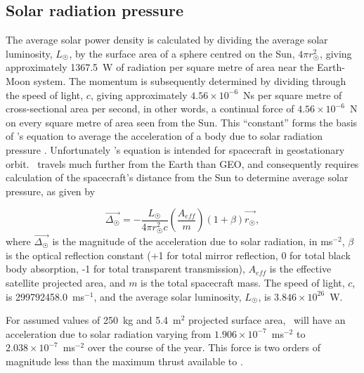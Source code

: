 \subsection{Solar radiation pressure} \label{sub:Solar-Wind}


The average solar power density is calculated by dividing the average solar luminosity, $L_\Sun$,  by the surface area of a sphere centred on the Sun, $4\pi r_\Sun^2$, giving approximately 1367.5~W of radiation per square metre of area near the Earth-Moon system. The momentum is subsequently determined by dividing through the speed of light, $c$, giving approximately $4.56\times10^{-6}$~Ns per square metre of cross-sectional area per second, in other words, a continual force of $4.56\times10^{-6}$~N on every square metre of area seen from the Sun. This \enquote{constant} forms the basis of \citeauthor{Chobotov2002}'s equation to average the acceleration of a body due to solar radiation pressure \parencite[p. 223]{Chobotov2002}. Unfortunately \citeauthor{Chobotov2002}'s equation is intended for spacecraft in geostationary orbit. \BW\ travels much further from the Earth than GEO, and consequently requires calculation of the spacecraft's distance from the Sun to determine average solar pressure, as given by

\begin{equation}\label{eq:solar-wind}
\vec{\Delta_\Sun} = -\frac{L_\Sun}{4\pi r_\Sun^2c}\left(\frac{A_{eff}}{m}\right)(1+\beta)\vec{\hat{r_\Sun}},
\end{equation}
where $\vec{\Delta_\Sun}$ is the magnitude of the acceleration due to solar radiation, in ms$^{-2}$, $\beta$ is the optical reflection constant (+1 for total mirror reflection, 0 for total black body absorption, -1 for total transparent transmission), $A_{eff}$ is the effective satellite projected area, and $m$ is the total spacecraft mass. The speed of light, $c$, is 299792458.0~ms$^{-1}$, and the average solar luminosity, $L_\Sun$, is $3.846\times10^{26}$~W.

For assumed values of 250~kg and 5.4~m$^2$ projected surface area, \BW\ will have an acceleration due to solar radiation varying from $1.906\times10^{-7}$~ms$^{-2}$ to $2.038\times10^{-7}$~ms$^{-2}$ over the course of the year. This force is two orders of magnitude less than the maximum thrust available to \BW.

